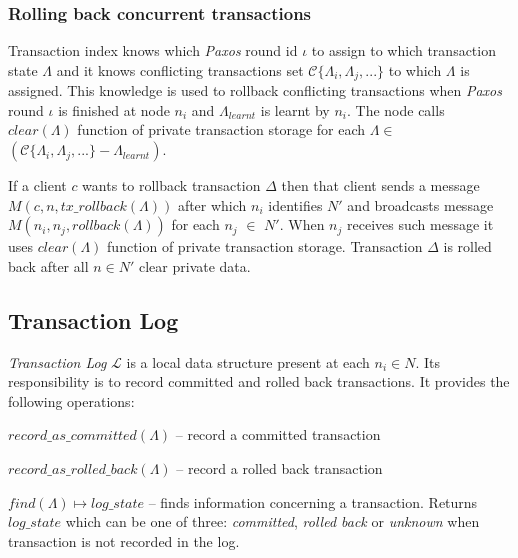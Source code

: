 \documentclass[runningheads,a4paper]{llncs}
\newcommand{\nodes}{$\mathit{N}$\xspace}
\newcommand{\nodesTx}{$\mathit{N'}$\xspace}
\newcommand{\transaction}{$\Delta$\xspace}
\newcommand{\txStates}{$\{\Lambda_{i}, \Lambda_{j}, ...\}$\xspace}
\newcommand{\txLog}{$\mathcal{L}$\xspace}
\newcommand{\conflictingTxSet}{$\mathcal{C}\text{\txStates}$\xspace}
\newcommand{\txRollbackMessage}{$\mathit{M}(c,n,\mathit{tx\_rollback}(\Lambda))$\xspace}
\newcommand{\rollbackMessage}{$\mathit{M}(n_{i}, n_{j}, \mathit{rollback}(\Lambda))$\xspace}
\newcommand{\paxosRoundId}{$\iota$\xspace}
\newcommand{\txState}{$\Lambda$\xspace}
\newcommand{\txStatei}[1]{$\Lambda_{#1}$\xspace}
\newcommand{\txStateCommitted}{$\Lambda_{learnt}$\xspace}
\newcommand{\paxos}{\emph{Paxos}\xspace}
\newcommand{\client}{$c$\xspace}
\newcommand{\node}[1]{$n_{#1}$\xspace}
\begin{document}

\subsubsection{Rolling back concurrent transactions}
Transaction index knows which \paxos round id \paxosRoundId to assign to which transaction state \txState and it knows conflicting transactions set \conflictingTxSet to which \txState is assigned. This knowledge is used to rollback conflicting transactions when \paxos round \paxosRoundId is finished at node \node{i} and \txStateCommitted is learnt by \node{i}. The node calls $\mathit{clear}(\text{\txState})$ function of private transaction storage for each \mbox{\txState $\in$ $(\text{\conflictingTxSet} - \text{\txStateCommitted})$}.

If a client \client wants to rollback transaction \transaction then that client sends a message \txRollbackMessage after which \node{i} identifies \nodesTx and broadcasts message \rollbackMessage for each \node{j} $\in$ \nodesTx. When \node{j} receives such message it uses $\mathit{clear}(\text{\txState})$ function of private transaction storage. Transaction \transaction is rolled back after all \mbox{$n\in \text{\nodesTx}$} clear private data.

\subsection{Transaction Log}
\label{sec:mpp:transactionLog}

\emph{Transaction Log} \txLog is a local data structure present at each \node{i}$\in\text{\nodes}$. Its responsibility is to record committed and rolled back transactions. It provides the following operations:
  \begin{enumerate*}[label=\alph*)]
    \item $\mathit{record\_as\_committed(\text{\txState})}$ -- record a committed transaction
    \item $\mathit{record\_as\_rolled\_back(\text{\txState})}$ -- record a rolled back transaction
    \item $\mathit{find(\text{\txState})} \mapsto \mathit{log\_state}$ -- finds information concerning a transaction. Returns $\mathit{log\_state}$ which can be one of three: \emph{committed}, \emph{rolled back} or \emph{unknown} when transaction is not recorded in the log.
  \end{enumerate*} 
\end{document}
